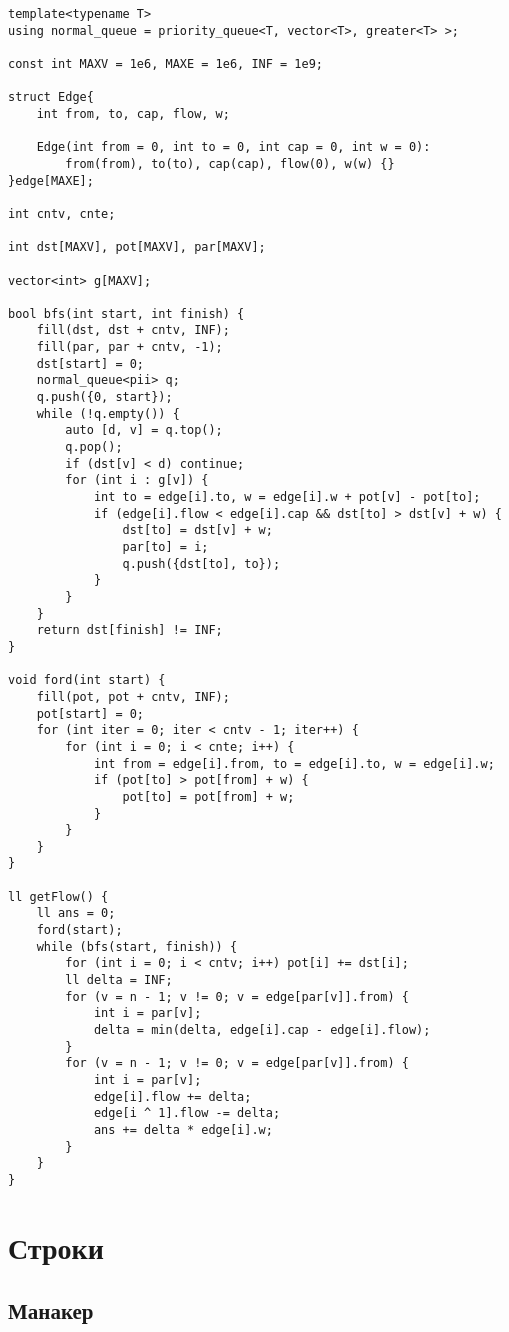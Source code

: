 \documentclass{article}
\begin{document}
    \begin{verbatim}
template<typename T>
using normal_queue = priority_queue<T, vector<T>, greater<T> >;

const int MAXV = 1e6, MAXE = 1e6, INF = 1e9;

struct Edge{
    int from, to, cap, flow, w;

    Edge(int from = 0, int to = 0, int cap = 0, int w = 0):
        from(from), to(to), cap(cap), flow(0), w(w) {}
}edge[MAXE];

int cntv, cnte;

int dst[MAXV], pot[MAXV], par[MAXV];

vector<int> g[MAXV];

bool bfs(int start, int finish) {
    fill(dst, dst + cntv, INF);
    fill(par, par + cntv, -1);
    dst[start] = 0;
    normal_queue<pii> q;
    q.push({0, start});
    while (!q.empty()) {
        auto [d, v] = q.top();
        q.pop();
        if (dst[v] < d) continue;
        for (int i : g[v]) {
            int to = edge[i].to, w = edge[i].w + pot[v] - pot[to];
            if (edge[i].flow < edge[i].cap && dst[to] > dst[v] + w) {
                dst[to] = dst[v] + w;
                par[to] = i;
                q.push({dst[to], to});
            }
        }
    }
    return dst[finish] != INF;
}

void ford(int start) {
    fill(pot, pot + cntv, INF);
    pot[start] = 0;
    for (int iter = 0; iter < cntv - 1; iter++) {
        for (int i = 0; i < cnte; i++) {
            int from = edge[i].from, to = edge[i].to, w = edge[i].w;
            if (pot[to] > pot[from] + w) {
                pot[to] = pot[from] + w;
            }
        }
    }
}

ll getFlow() {
    ll ans = 0;
    ford(start);
    while (bfs(start, finish)) {
        for (int i = 0; i < cntv; i++) pot[i] += dst[i];
        ll delta = INF;
        for (v = n - 1; v != 0; v = edge[par[v]].from) {
            int i = par[v];
            delta = min(delta, edge[i].cap - edge[i].flow);
        }
        for (v = n - 1; v != 0; v = edge[par[v]].from) {
            int i = par[v];
            edge[i].flow += delta;
            edge[i ^ 1].flow -= delta;
            ans += delta * edge[i].w;
        }
    }
}
    \end{verbatim}   
    
    \section{Строки}
    \subsection{Манакер}
    
\end{document}
